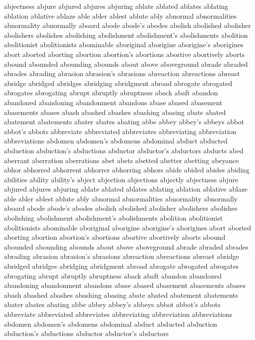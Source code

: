 abjectness
abjure
abjured
abjures
abjuring
ablate
ablated
ablates
ablating
ablation
ablative
ablaze
able
abler
ablest
ablute
ably
abnormal
abnormalities
abnormality
abnormally
aboard
abode
abode's
abodes
abolish
abolished
abolisher
abolishers
abolishes
abolishing
abolishment
abolishment's
abolishments
abolition
abolitionist
abolitionists
abominable
aboriginal
aborigine
aborigine's
aborigines
abort
aborted
aborting
abortion
abortion's
abortions
abortive
abortively
aborts
abound
abounded
abounding
abounds
about
above
aboveground
abrade
abraded
abrades
abrading
abrasion
abrasion's
abrasions
abreaction
abreactions
abreast
abridge
abridged
abridges
abridging
abridgment
abroad
abrogate
abrogated
abrogates
abrogating
abrupt
abruptly
abruptness
aback
abaft
abandon
abandoned
abandoning
abandonment
abandons
abase
abased
abasement
abasements
abases
abash
abashed
abashes
abashing
abasing
abate
abated
abatement
abatements
abater
abates
abating
abbe
abbey
abbey's
abbeys
abbot
abbot's
abbots
abbreviate
abbreviated
abbreviates
abbreviating
abbreviation
abbreviations
abdomen
abdomen's
abdomens
abdominal
abduct
abducted
abduction
abduction's
abductions
abductor
abductor's
abductors
abducts
abed
aberrant
aberration
aberrations
abet
abets
abetted
abetter
abetting
abeyance
abhor
abhorred
abhorrent
abhorrer
abhorring
abhors
abide
abided
abides
abiding
abilities
ability
ability's
abject
abjection
abjections
abjectly
abjectness
abjure
abjured
abjures
abjuring
ablate
ablated
ablates
ablating
ablation
ablative
ablaze
able
abler
ablest
ablute
ably
abnormal
abnormalities
abnormality
abnormally
aboard
abode
abode's
abodes
abolish
abolished
abolisher
abolishers
abolishes
abolishing
abolishment
abolishment's
abolishments
abolition
abolitionist
abolitionists
abominable
aboriginal
aborigine
aborigine's
aborigines
abort
aborted
aborting
abortion
abortion's
abortions
abortive
abortively
aborts
abound
abounded
abounding
abounds
about
above
aboveground
abrade
abraded
abrades
abrading
abrasion
abrasion's
abrasions
abreaction
abreactions
abreast
abridge
abridged
abridges
abridging
abridgment
abroad
abrogate
abrogated
abrogates
abrogating
abrupt
abruptly
abruptness
aback
abaft
abandon
abandoned
abandoning
abandonment
abandons
abase
abased
abasement
abasements
abases
abash
abashed
abashes
abashing
abasing
abate
abated
abatement
abatements
abater
abates
abating
abbe
abbey
abbey's
abbeys
abbot
abbot's
abbots
abbreviate
abbreviated
abbreviates
abbreviating
abbreviation
abbreviations
abdomen
abdomen's
abdomens 
abdominal
abduct
abducted 
abduction
abduction's
abductions
abductor
abductor's
abductors
